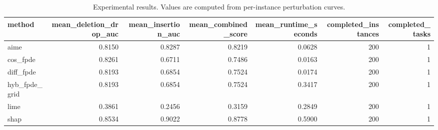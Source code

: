 \begin{table}[t]
\caption{Experimental results. Values are computed from per-instance perturbation curves.}
\label{tab:main_results_computed}
\centering
\begin{tabular}{lrrrrrr}
\toprule
method & mean\_deletion\_drop\_auc & mean\_insertion\_auc & mean\_combined\_score & mean\_runtime\_seconds & completed\_instances & completed\_tasks \\
\midrule
aime & 0.8150 & 0.8287 & 0.8219 & 0.0628 & 200 & 1 \\
cos\_fpde & 0.8261 & 0.6711 & 0.7486 & 0.0163 & 200 & 1 \\
diff\_fpde & 0.8193 & 0.6854 & 0.7524 & 0.0174 & 200 & 1 \\
hyb\_fpde\_grid & 0.8193 & 0.6854 & 0.7524 & 0.3417 & 200 & 1 \\
lime & 0.3861 & 0.2456 & 0.3159 & 0.2849 & 200 & 1 \\
shap & 0.8534 & 0.9022 & 0.8778 & 0.5900 & 200 & 1 \\
\bottomrule
\end{tabular}

\end{table}
